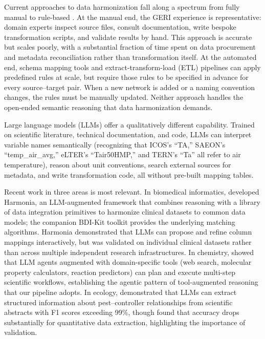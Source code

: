 \documentclass[review,authoryear]{elsarticle}
\begin{document}
Current approaches to data harmonization fall along a spectrum from fully manual to rule-based \citep{cheng2024harmonization}. At the manual end, the GERI experience is representative: domain experts inspect source files, consult documentation, write bespoke transformation scripts, and validate results by hand. This approach is accurate but scales poorly, with a substantial fraction of time spent on data procurement and metadata reconciliation rather than transformation itself. At the automated end, schema mapping tools and extract-transform-load (ETL) pipelines can apply predefined rules at scale, but require those rules to be specified in advance for every source--target pair. When a new network is added or a naming convention changes, the rules must be manually updated. Neither approach handles the open-ended semantic reasoning that data harmonization demands.

Large language models (LLMs) offer a qualitatively different capability. Trained on scientific literature, technical documentation, and code, LLMs can interpret variable names semantically (recognizing that ICOS's ``TA,'' SAEON's ``temp\_air\_avg,'' eLTER's ``Tair50HMP,'' and TERN's ``Ta'' all refer to air temperature), reason about unit conventions, search external sources for metadata, and write transformation code, all without pre-built mapping tables.

Recent work in three areas is most relevant. In biomedical informatics, \citet{santos2025harmonia} developed Harmonia, an LLM-augmented framework that combines reasoning with a library of data integration primitives to harmonize clinical datasets to common data models; the companion BDI-Kit toolkit \citep{lopez2026bdikit} provides the underlying matching algorithms. Harmonia demonstrated that LLMs can propose and refine column mappings interactively, but was validated on individual clinical datasets rather than across multiple independent research infrastructures. In chemistry, \citet{bran2024chemcrow} showed that LLM agents augmented with domain-specific tools (web search, molecular property calculators, reaction predictors) can plan and execute multi-step scientific workflows, establishing the agentic pattern of tool-augmented reasoning that our pipeline adopts. In ecology, \citet{scheepens2024llm} demonstrated that LLMs can extract structured information about pest--controller relationships from scientific abstracts with F1 scores exceeding 99\%, though \citet{gougherty2024llm} found that accuracy drops substantially for quantitative data extraction, highlighting the importance of validation.
\end{document}
